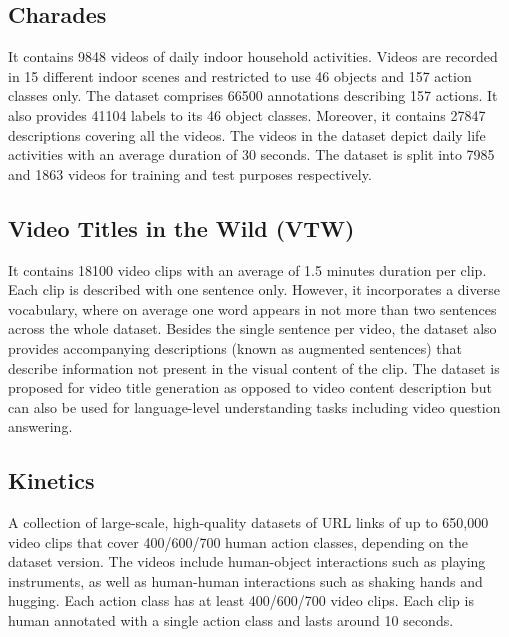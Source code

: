 \subsection{Charades}

\par It contains 9848 videos of daily indoor household activities. Videos are recorded in 15 different indoor scenes and restricted to use 46 objects and 157 action classes only. The dataset comprises 66500 annotations describing 157 actions. It also provides 41104 labels to its 46 object classes. Moreover, it contains 27847 descriptions covering all the videos. The videos in the dataset depict daily life activities with an average duration of 30 seconds. The dataset is split into 7985 and 1863 videos for training and test purposes respectively.

\subsection{Video Titles in the Wild (VTW)}

\par It contains 18100 video clips with an average of 1.5 minutes duration per clip. Each clip is described with one sentence only. However, it incorporates a diverse vocabulary, where on average one word appears in not more than two sentences across the whole dataset. Besides the single sentence per video, the dataset also provides accompanying descriptions (known as augmented sentences) that describe information not present in the visual content of the clip. The dataset is proposed for video title generation as opposed to video content description but can also be used for language-level understanding tasks including video question answering. 

\subsection{Kinetics}

\par A collection of large-scale, high-quality datasets of URL links of up to 650,000 video clips that cover 400/600/700 human action classes, depending on the dataset version. The videos include human-object interactions such as playing instruments, as well as human-human interactions such as shaking hands and hugging. Each action class has at least 400/600/700 video clips. Each clip is human annotated with a single action class and lasts around 10 seconds.


